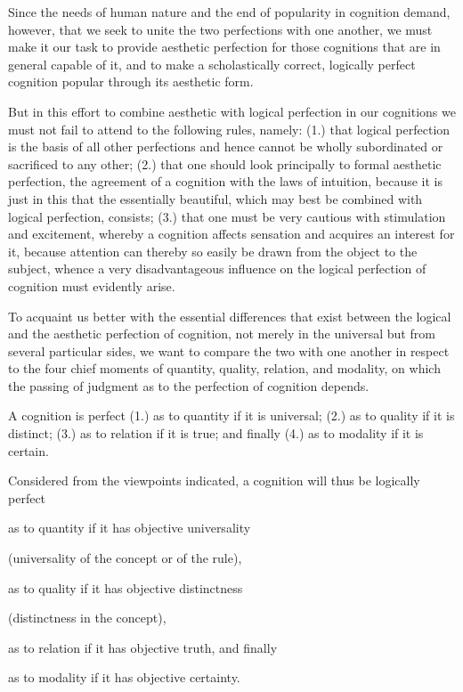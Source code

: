     Since the needs of human nature and the end of popularity in cognition
    demand, however, that we seek to unite the two perfections with one
    another, we must make it our task to provide aesthetic perfection for those
    cognitions that are in general capable of it, and to make a scholastically
    correct, logically perfect cognition popular through its aesthetic form.

But in this effort to combine aesthetic with logical perfection
in our cognitions we must not fail to attend to the following rules, namely:
(1.) that logical perfection is the basis of all other perfections and
hence cannot be wholly subordinated or sacrificed to any other;
(2.) that one should look principally to formal aesthetic perfection,
the agreement of a cognition with the laws of intuition,
because it is just in this that the essentially beautiful,
which may best be combined with logical perfection, consists;
(3.) that one must be very cautious with stimulation and excitement,
whereby a cognition affects sensation and acquires an interest for it,
because attention can thereby so easily be drawn from the object to the subject,
whence a very disadvantageous influence on
the logical perfection of cognition must evidently arise.

To acquaint us better with the essential differences that exist between
the logical and the aesthetic perfection of cognition,
not merely in the universal but from several particular sides,
we want to compare the two with one another in respect to
the four chief moments of quantity, quality, relation, and modality,
on which the passing of judgment as to the perfection of cognition depends.

A cognition is perfect
(1.) as to quantity if it is universal;
(2.) as to quality if it is distinct;
(3.) as to relation if it is true; and finally
(4.) as to modality if it is certain.

Considered from the viewpoints indicated,
a cognition will thus be logically perfect

as to quantity if it has objective universality

    (universality of the concept or of the rule),

as to quality if it has objective distinctness

    (distinctness in the concept),

as to relation if it has objective truth, and finally

as to modality if it has objective certainty.

